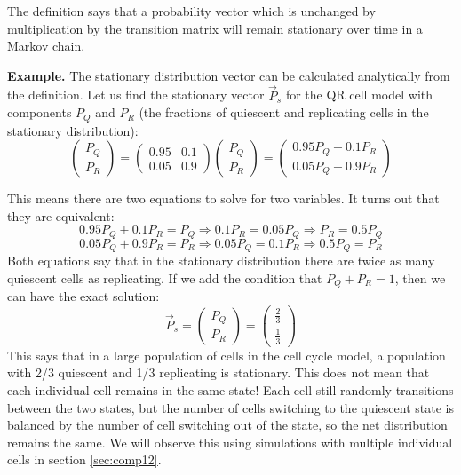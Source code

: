 \documentclass[
  letterpaper,
  DIV=11,
  numbers=noendperiod]{scrreprt}
\begin{document}
The definition says that a probability vector which is unchanged by
multiplication by the transition matrix will remain stationary over time
in a Markov chain. \cite{feller_introduction_????}

\textbf{Example.} The stationary distribution vector can be calculated
analytically from the definition. Let us find the stationary vector
\(\vec P_s\) for the QR cell model with components \(P_Q\) and \(P_R\)
(the fractions of quiescent and replicating cells in the stationary
distribution):
\[  \left(\begin{array}{c} P_Q  \\ P_R \end{array} \right) =\left(\begin{array}{cc}0.95 & 0.1 \\0.05 & 0.9\end{array}\right)  \left(\begin{array}{c} P_Q  \\ P_R \end{array}\right) =  \left(\begin{array}{c}0.95P_Q + 0.1P_R \\0.05P_Q + 0.9P_R \end{array}\right) \]

This means there are two equations to solve for two variables. It turns
out that they are equivalent:
\[ 0.95P_Q + 0.1P_R = P_Q \Rightarrow 0.1P_R = 0.05P_Q \Rightarrow P_R = 0.5P_Q\]
\[ 0.05P_Q + 0.9P_R  = P_R \Rightarrow 0.05P_Q  = 0.1P_R  \Rightarrow  0.5P_Q =  P_R  \]
Both equations say that in the stationary distribution there are twice
as many quiescent cells as replicating. If we add the condition that
\(P_Q+P_R = 1\), then we can have the exact solution:
\[\vec P_s =  \left(\begin{array}{c} P_Q  \\ P_R \end{array} \right)  =  \left(\begin{array}{c} \frac{2}{3}  \\ \frac{1}{3} \end{array} \right) \]
This says that in a large population of cells in the cell cycle model, a
population with 2/3 quiescent and 1/3 replicating is stationary. This
does not mean that each individual cell remains in the same state! Each
cell still randomly transitions between the two states, but the number
of cells switching to the quiescent state is balanced by the number of
cell switching out of the state, so the net distribution remains the
same. We will observe this using simulations with multiple individual
cells in section \ref{sec:comp12}.
\end{document}
